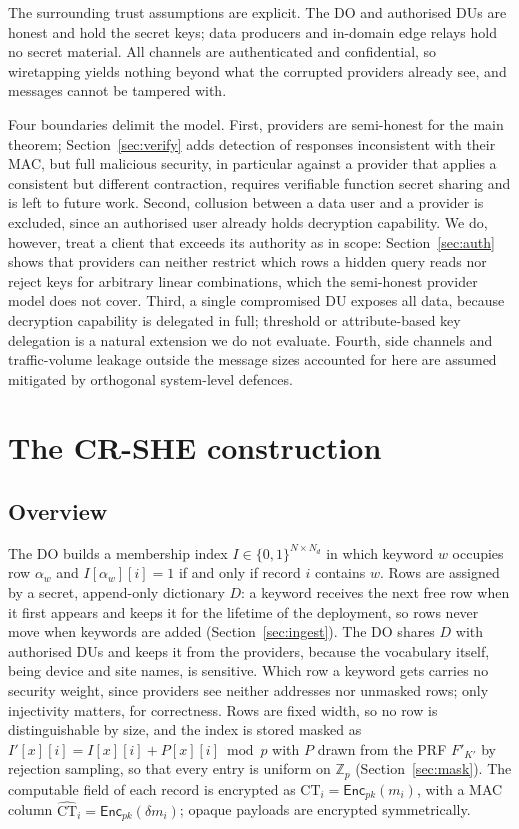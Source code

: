 \documentclass[a4paper,fleqn]{cas-sc}
\newcommand{\Enc}{\mathsf{Enc}}
\begin{document}
The surrounding trust assumptions are explicit. The DO and authorised DUs are
honest and hold the secret keys; data producers and in-domain edge relays hold
no secret material. All channels are authenticated and confidential, so
wiretapping yields nothing beyond what the corrupted providers already see,
and messages cannot be tampered with.

Four boundaries delimit the model. First, providers are semi-honest for the
main theorem; Section~\ref{sec:verify} adds detection of responses
inconsistent with their MAC, but full malicious security, in particular
against a provider that applies a consistent but different contraction,
requires verifiable function secret sharing and is left to future work.
Second, collusion between a data user and a provider is excluded, since an
authorised user already holds decryption capability. We do, however, treat a
client that exceeds its authority as in scope: Section~\ref{sec:auth} shows
that providers can neither restrict which rows a hidden query reads nor reject
keys for arbitrary linear combinations, which the semi-honest provider model
does not cover. Third, a single compromised DU exposes all data, because
decryption capability is delegated in full; threshold or attribute-based key
delegation is a natural extension we do not evaluate. Fourth, side channels
and traffic-volume leakage outside the message sizes accounted for here are
assumed mitigated by orthogonal system-level defences.

\section{The CR-SHE construction}
\label{sec:construction}

\subsection{Overview}
The DO builds a membership index $I\in\{0,1\}^{N\times N_d}$ in which keyword
$w$ occupies row $\alpha_w$ and $I[\alpha_w][i]=1$ if and only if record $i$
contains $w$. Rows are assigned by a secret, append-only dictionary $D$: a
keyword receives the next free row when it first appears and keeps it for the
lifetime of the deployment, so rows never move when keywords are added
(Section~\ref{sec:ingest}). The DO shares $D$ with authorised DUs and keeps it
from the providers, because the vocabulary itself, being device and site
names, is sensitive. Which row a keyword gets carries no security weight,
since providers see neither addresses nor unmasked rows; only injectivity
matters, for correctness. Rows are fixed width, so no row is distinguishable
by size, and the index is stored masked as $I'[x][i]=I[x][i]+P[x][i]\bmod p$
with $P$ drawn from the PRF $F'_{K'}$ by rejection sampling, so that every
entry is uniform on $\mathbb{Z}_p$ (Section~\ref{sec:mask}).
The computable field of each record is encrypted as
$\text{CT}_i=\Enc_{pk}(m_i)$, with a MAC column
$\widehat{\text{CT}}_i=\Enc_{pk}(\delta m_i)$; opaque payloads are encrypted
symmetrically.
\end{document}
